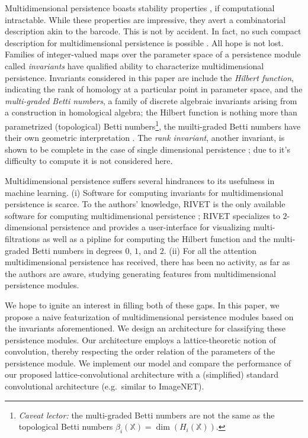 \documentclass{article}
\begin{document}
Multidimensional persistence boasts stability properties \cite{lesnick_theory_2015}, if computational intractable.
While these properties are impressive, they avert a combinatorial description akin to the barcode.
This is not by accident.
In fact, no such compact description for
multidimensional persistence is possible \cite{carlsson_theory_2009}.
All hope is not lost. Families of integer-valued maps over the parameter space of a persistence module called \textit{invariants} have qualified ability to characterize multidimensional persistence.
Invariants considered in this paper are include the \textit{Hilbert function}, indicating the rank of homology at a particular point in parameter space, and the \textit{multi-graded Betti numbers}, a family of discrete algebraic invariants arising from a construction in homological algebra; the Hilbert function is nothing more than parametrized (topological) Betti numbers\footnote{\textit{Caveat lector:} the
multi-graded Betti numbers are not the same as the topological Betti numbers
$\beta_i(\mathbb{X}) = \dim(H_i(\mathbb{X}))$.}, the muilti-graded Betti numbers have their own geometric interpretation \cite{Knudson2008}.
The \textit{rank invariant}, another invariant, is shown to be complete in the case of single dimensional persistence \cite{carlsson_theory_2009}; due to it's difficulty to compute it is not considered here.

Multidimensional persistence suffers several hindrances to its usefulness in machine learning. (i) Software for computing invariants for multidimensional persistence is scarce. To the authors' knowledge, RIVET is the only available software for computing multidimensional persistence \cite{lesnick_interactive_2015}; RIVET specializes to $2$-dimensional persistence and provides a user-interface for visualizing multi-filtrations as well as a pipline for computing the Hilbert function and the multi-graded Betti numbers in degrees $0$, $1$, and $2$. (ii) For all the attention multidimensional persistence has received, there has been no activity, as far as the authors are aware, studying generating features from multidimensional persistence modules.

We hope to ignite an interest in filling both of these gaps. In this paper, we propose a naive featurization of multidimensional persistence modules based on the invariants aforementioned. We design an architecture for classifying these persistence modules. Our architecture employs a lattice-theoretic notion of convolution, thereby respecting the order relation of the parameters of the persistence module. We implement our model and compare the performance of our proposed lattice-convolutional architecture with a (simplified) standard convolutional architecture (e.g.~similar to ImageNET).
\end{document}
